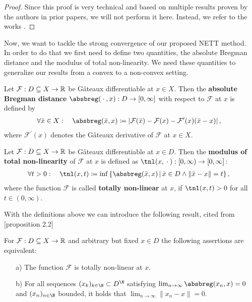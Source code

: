 \begin{proof}
Since this proof is very technical and based on multiple results proven by the authors in prior papers, we will not perform it here. Instead, we refer to the works \cite{li2020nett, grasmair2010generalized, scherzer2009variational}.
\end{proof}

Now, we want to tackle the strong convergence of our proposed NETT method. In order to do that we first need to define two quantities, the absolute Bregman distance and the modulus of total non-linearity. We need these quantities to generalize our results from a convex to a non-convex setting.

\begin{definition}\label{Def_absbreg}
Let $\mathcal{F}: D\subseteq X \to \operatorname{\mathbb{R}}$ be G\^ateaux differentiable at $x \in X$. Then the \textbf{absolute Bregman distance} $\absbreg(\wc,x): D \to [0,\infty]$ with respect to $\mathcal{F}$ at $x$ is defined by
\begin{align*}
\forall \bar{x} \in X: \quad \absbreg (\bar{x},x) \coloneqq \left|\mathcal{F}(\bar{x}) -\mathcal{F}(x) - \mathcal{F}^\prime(x)(\bar{x} - x)\right|,
\end{align*}
where $\mathcal{F}^\prime(x)$ denotes the G\^ateaux derivative of $\mathcal{F}$ at $x\in X$.
\end{definition}

\begin{definition}\label{Def_tnl}
Let $\mathcal{F}: D\subseteq X \to \operatorname{\mathbb{R}}$ be G\^ateaux differentiable at $x \in D$. Then the \textbf{modulus of total non-linearity} of $\mathcal{F}$ at $x$ is defined as $\tnl(x,\wc): [0,\infty) \to [0, \infty]$:
\begin{align*}
\forall t > 0: \quad \tnl(x,t)\coloneqq \inf \left\{\absbreg(\bar{x}, x) \,|\, \bar{x} \in D \wedge \|\bar{x} - x \| = t \right\},
\end{align*}
where the function $\mathcal{F}$ is called \textbf{totally non-linear} at $x$, if $\tnl(x,t) > 0$ for all $t \in (0, \infty)$.
\end{definition}

\newpage
With the definitions above we can introduce the following result, cited from \cite{resmerita2004total}[proposition 2.2]

\begin{proposition}\label{prop2}
For $\mathcal{F}: D \subseteq X \to \operatorname{\mathbb{R}}$ and arbitrary but fixed $x \in D$ the following assertions are equivalent:
\begin{enumerate}
\item[a)] The function $\mathcal{F}$ is totally non-linear at $x$.
\item[b)] For all sequences $(x_k)_{k \in\N} \subset D^{\N}$ satisfying $\lim_{n \to \infty}\absbreg(x_n,x) = 0$ and $(x_n)_{n\in\N}$ bounded, it holds that $\lim_{n\to\infty} \|x_n - x\| = 0$.
\end{enumerate}
\end{proposition}

